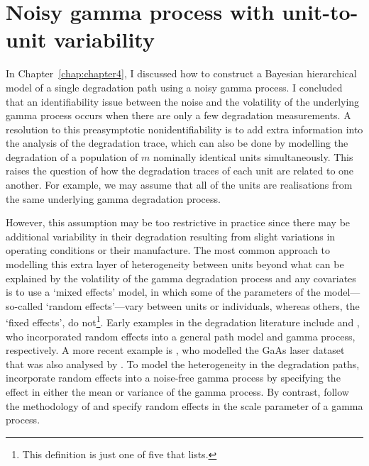 \chapter{Noisy gamma process with unit-to-unit variability} \label{chap:chapter5}

In Chapter~\ref{chap:chapter4}, I discussed how to construct a Bayesian hierarchical model of a single degradation path using a noisy gamma process. I concluded that an identifiability issue between the noise and the volatility of the underlying gamma process occurs when there are only a few degradation measurements. A resolution to this preasymptotic nonidentifiability is to add extra information into the analysis of the degradation trace, which can also be done by modelling the degradation of a population of $m$ nominally identical units simultaneously. This raises the question of how the degradation traces of each unit are related to one another. For example, we may assume that all of the units are realisations from the same underlying gamma degradation process.

However, this assumption may be too restrictive in practice since there may be additional variability in their degradation resulting from slight variations in operating conditions or their manufacture. The most common approach to modelling this extra layer of heterogeneity between units beyond what can be explained by the volatility of the gamma degradation process and any covariates is to use a `mixed effects' model, in which some of the parameters of the model---so-called `random effects'---vary between units or individuals, whereas others, the `fixed effects', do not\footnote{This definition is just one of five that \citet{Gelman2005} lists.}. Early examples in the degradation literature include \citet{lu1993} and \citet{lawless2004}, who incorporated random effects into a general path model and gamma process, respectively. A more recent example is \citet{rodriguez-picon2018}, who modelled the GaAs laser dataset that was also analysed by \citet{Meeker1998}. To model the heterogeneity in the degradation paths, \citet{rodriguez-picon2018} incorporate random effects into a noise-free gamma process by specifying the effect in either the mean or variance of the gamma process. By contrast, \citet{peng_2018} follow the methodology of \citet{lawless2004} and specify random effects in the scale parameter of a gamma process.

